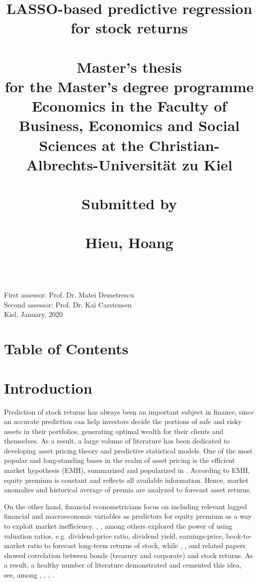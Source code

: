 \documentclass[12pt,a4paper]{article}
\title{LASSO-based predictive regression for stock returns \\~\\
\large Master's thesis \\
\large for the Master's degree programme Economics in the Faculty of Business, Economics and Social Sciences at the Christian-Albrechts-Universität zu Kiel \\~\\
\large Submitted by \\~\\
\large Hieu, Hoang}
\date{}
\begin{document}
\begin{titlepage}
	\maketitle
	\mbox{} \\[1in]
	First assessor: Prof. Dr. Matei Demetrescu \\
	Second assessor: Prof. Dr. Kai Carstensen \\
	Kiel, January, 2020
	
\end{titlepage}

\section*{Table of Contents}
\tableofcontents
\newpage

\section{Introduction}
Prediction of stock returns has always been an important subject in finance, since an accurate prediction can help investors decide the portions of safe and risky assets in their portfolios, generating optimal wealth for their clients and themselves. As a result, a large volume of literature has been dedicated to developing asset pricing theory and predictive statistical models. One of the most popular and long-standing bases in the realm of asset pricing is the efficient market hypothesis (EMH), summarized and popularized in \cite{fama1970efficient}. According to EMH, equity premium is constant and reflects all available information. Hence, market anomalies and historical average of premia are analyzed to forecast asset returns.

On the other hand, financial econometricians focus on including relevant lagged financial and macroeconomic variables as predictors for equity premium as a way to exploit market inefficiency. \cite{fama1988dividend}, \cite{schiller1998valuation}, among others explored the power of using valuation ratios, e.g. dividend-price ratio, dividend yield, earnings-price, book-to-market ratio to forecast long-term returns of stock, while \cite{fama1990stock}, \cite{schwert1990stock}, and related papers showed correlation between bonds (treasury and corporate) and stock returns. As a result, a healthy number of literature demonstrated and cemented this idea, see, among \cite{hodrick1992dividend}, \cite{kothari1997book}, \cite{lamont1998earnings}, 
\cite{pontiff1998book}.
\end{document}

